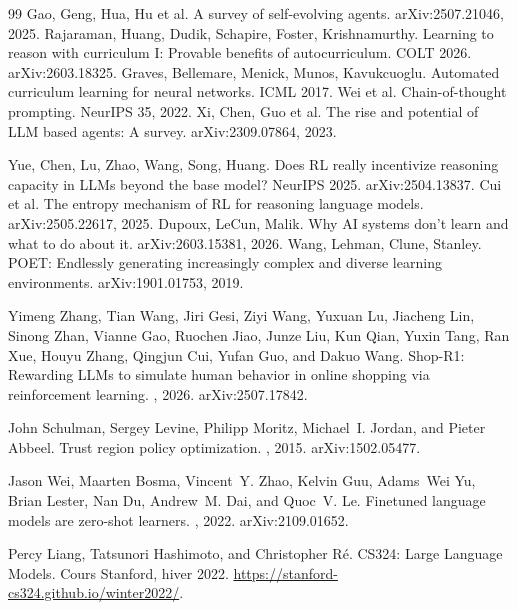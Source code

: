 \begin{thebibliography}{99}
 Gao, Geng, Hua, Hu et al. A survey of self-evolving agents. arXiv:2507.21046, 2025.
 Rajaraman, Huang, Dudik, Schapire, Foster, Krishnamurthy. Learning to reason with curriculum I: Provable benefits of autocurriculum. COLT 2026. arXiv:2603.18325.
 Graves, Bellemare, Menick, Munos, Kavukcuoglu. Automated curriculum learning for neural networks. ICML 2017.
 Wei et al. Chain-of-thought prompting. NeurIPS 35, 2022.
 Xi, Chen, Guo et al. The rise and potential of LLM based agents: A survey. arXiv:2309.07864, 2023.

 Yue, Chen, Lu, Zhao, Wang, Song, Huang. Does RL really incentivize reasoning capacity in LLMs beyond the base model? NeurIPS 2025. arXiv:2504.13837.
 Cui et al. The entropy mechanism of RL for reasoning language models. arXiv:2505.22617, 2025.
 Dupoux, LeCun, Malik. Why AI systems don't learn and what to do about it. arXiv:2603.15381, 2026.
 Wang, Lehman, Clune, Stanley. POET: Endlessly generating increasingly complex and diverse learning environments. arXiv:1901.01753, 2019.
\end{thebibliography}

Yimeng Zhang, Tian Wang, Jiri Gesi, Ziyi Wang, Yuxuan Lu, Jiacheng Lin, Sinong Zhan, Vianne Gao, Ruochen Jiao, Junze Liu, Kun Qian, Yuxin Tang, Ran Xue, Houyu Zhang, Qingjun Cui, Yufan Guo, and Dakuo Wang.
\newblock Shop-R1: Rewarding LLMs to simulate human behavior in online shopping via reinforcement learning.
, 2026. arXiv:2507.17842.

John Schulman, Sergey Levine, Philipp Moritz, Michael~I. Jordan, and Pieter Abbeel.
\newblock Trust region policy optimization.
, 2015. arXiv:1502.05477.

Jason Wei, Maarten Bosma, Vincent~Y. Zhao, Kelvin Guu, Adams~Wei Yu, Brian Lester, Nan Du, Andrew~M. Dai, and Quoc~V. Le.
\newblock Finetuned language models are zero-shot learners.
, 2022. arXiv:2109.01652.

Percy Liang, Tatsunori Hashimoto, and Christopher R\'e.
\newblock CS324: Large Language Models. Cours Stanford, hiver 2022.
\newblock \url{https://stanford-cs324.github.io/winter2022/}.

